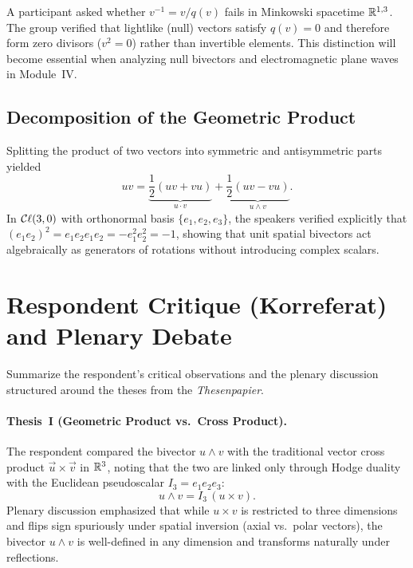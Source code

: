 \documentclass[11pt,a4paper]{article}
\begin{document}
\begin{discussionnote}
  A participant asked whether $v^{-1} = v / q(v)$ fails in Minkowski
  spacetime $\mathbb{R}^{1,3}$. The group verified that lightlike (null) vectors
  satisfy $q(v) = 0$ and therefore form zero divisors ($v^2 = 0$) rather than
  invertible elements. This distinction will become essential when analyzing
  null bivectors and electromagnetic plane waves in Module~IV.
\end{discussionnote}

\subsection{Decomposition of the Geometric Product}
\label{subsec:decomp}

Splitting the product of two vectors into symmetric and antisymmetric parts
yielded
\[
  uv = \underbrace{\frac{1}{2}(uv + vu)}_{u \cdot v}
     + \underbrace{\frac{1}{2}(uv - vu)}_{u \wedge v}.
\]
In $\mathcal{C}\ell(3,0)$ with orthonormal basis $\{e_1, e_2, e_3\}$, the speakers verified
explicitly that $(e_1 e_2)^2 = e_1 e_2 e_1 e_2 = -e_1^2 e_2^2 = -1$, showing
that unit spatial bivectors act algebraically as generators of rotations
without introducing complex scalars.

\section{Respondent Critique (Korreferat) and Plenary Debate}
\label{sec:debate}

Summarize the respondent's critical observations and the plenary discussion
structured around the theses from the \emph{Thesenpapier}.

\paragraph{Thesis~I (Geometric Product vs.\ Cross Product).}
The respondent compared the bivector $u \wedge v$ with the traditional vector
cross product $\vec{u} \times \vec{v}$ in $\mathbb{R}^3$, noting that the two are
linked only through Hodge duality with the Euclidean pseudoscalar
$I_3 = e_1 e_2 e_3$:
\[
  u \wedge v = I_3\, (u \times v).
\]
Plenary discussion emphasized that while $u \times v$ is restricted to three
dimensions and flips sign spuriously under spatial inversion (axial vs.\ polar
vectors), the bivector $u \wedge v$ is well-defined in any dimension and
transforms naturally under reflections.
\end{document}
